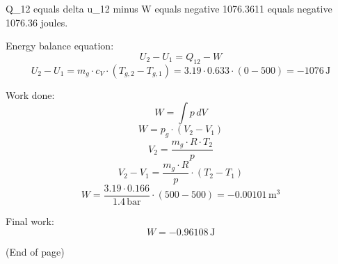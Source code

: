 Q_12 equals delta u_12 minus W equals negative 1076.3611 equals negative 1076.36 joules.

Energy balance equation:  
\[ U_2 - U_1 = Q_{12} - W \]  
\[ U_2 - U_1 = m_g \cdot c_V \cdot (T_{g,2} - T_{g,1}) = 3.19 \cdot 0.633 \cdot (0 - 500) = -1076 \, \text{J} \]  

Work done:  
\[ W = \int p \, dV \]  
\[ W = p_g \cdot (V_2 - V_1) \]  
\[ V_2 = \frac{m_g \cdot R \cdot T_2}{p} \]  
\[ V_2 - V_1 = \frac{m_g \cdot R}{p} \cdot (T_2 - T_1) \]  
\[ W = \frac{3.19 \cdot 0.166}{1.4 \, \text{bar}} \cdot (500 - 500) = -0.00101 \, \text{m}^3 \]  

Final work:  
\[ W = -0.96108 \, \text{J} \]  

(End of page)